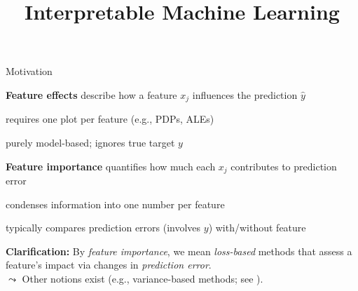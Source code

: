 \documentclass[10pt,compress,t,notes=noshow, xcolor=table]{beamer}
\title{Interpretable Machine Learning}
\begin{document}
	
	
	

	

\begin{framei}[align=top]{Motivation}
\item<1-3> \textbf{Feature effects} describe how a feature $x_j$ influences the prediction $\hat{y}$
\begin{itemizeS}
\item requires one plot per feature (e.g., PDPs, ALEs)
\item purely model-based; ignores true target $y$ %
\end{itemizeS}
\item<2-3> \textbf{Feature importance} quantifies how much each $x_j$ contributes to prediction error%
\begin{itemizeS}
\item condenses information into one number per feature
\item typically compares prediction errors (involves $y$) with/without feature
\end{itemizeS}
\item<3> \textbf{Clarification:} By \emph{feature importance}, we mean \emph{loss-based} methods that assess a feature's impact via changes in \emph{prediction error}. \\
$\leadsto$
Other notions exist (e.g., variance-based methods; see ).
\end{framei}
\end{document}
